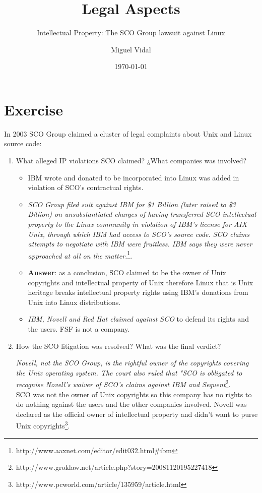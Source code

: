 \documentclass[11pt]{scrartcl}
\title{\textbf{Legal Aspects}}
\subtitle{Intellectual Property: The SCO Group lawsuit against Linux}
\author{Miguel Vidal}
\date{\today}
\begin{document}
\maketitle

\section{Exercise}

In 2003 SCO Group claimed a cluster of legal complaints about Unix and Linux source code:
 
\begin{enumerate}

	\item What alleged IP violations SCO claimed? ¿What companies was involved?

		\begin{itemize}
			\item IBM wrote and donated to be incorporated into Linux was added in violation of SCO's contractual rights.
			\item \emph{SCO Group filed suit against IBM for \$1 Billion (later raised to \$3 Billion) on unsubstantiated charges of having transferred SCO intellectual property to the Linux community in violation of IBM's license for AIX Unix, through which IBM had access to SCO's source code. SCO claims attempts to negotiate with IBM were fruitless. IBM says they were never approached at all on the matter.}\footnote{http://www.aaxnet.com/editor/edit032.html\#ibm}.
			
			\item \textbf{Answer}: as a conclusion, SCO claimed to be the owner of Unix copyrights and intellectual property of Unix therefore Linux that is Unix heritage breaks intellectual property rights using IBM's donations from Unix into Linux distributions.

			\item \emph{IBM, Novell and Red Hat claimed against SCO} to defend its rights and the users. FSF is not a company.
		\end{itemize}
		
	\item How the SCO litigation was resolved? What was the final verdict?

	\emph{Novell, not the SCO Group, is the rightful owner of the copyrights covering the Unix operating system. The court also ruled that "SCO is obligated to recognise Novell's waiver of SCO's claims against IBM and Sequent}\footnote{http://www.groklaw.net/article.php?story=20081120195227418}.\\
	SCO was not the owner of Unix copyrights so this company has no rights to do nothing against the users and the other companies involved. Novell was declared as the official owner of intellectual property and didn't want to purse Unix copyrights\footnote{http://www.pcworld.com/article/135959/article.html}.


\end{enumerate}
\end{document}
